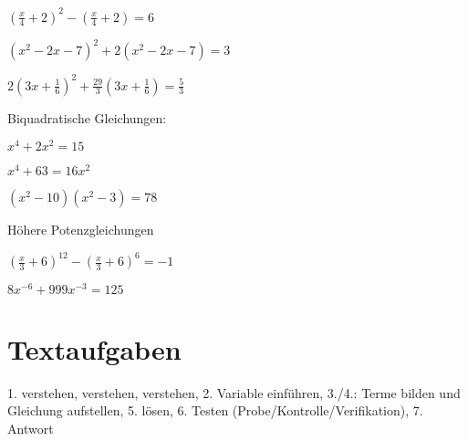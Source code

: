 \begin{bbwAufgabenBlock}
\item $\left( \frac{x}4 + 2  \right)^2 - \left( \frac{x}4 + 2 \right) = 6$

\item $\left( x^2-2x-7 \right)^2 + 2 \left(  x^2-2x-7 \right) = 3$

\item $2 \left( 3x+\frac16 \right)^2 +\frac{29}3 \left(  3x+\frac16 \right) = \frac53$

Biquadratische Gleichungen:

\item $x^4 + 2x^2 = 15$

\item $x^4 + 63 = 16x^2$


\item $(x^2-10)(x^2-3) = 78$


Höhere Potenzgleichungen

\item $\left(\frac{x}3 + 6 \right)^{12} - \left(\frac{x}3 + 6  \right)^6 = -1$

\item $8x^{-6} + 999x^{-3} = 125$


\end{bbwAufgabenBlock}
\newpage




\section{Textaufgaben}

1. verstehen, verstehen, verstehen, 2. Variable einführen, 3./4.: Terme bilden und Gleichung aufstellen,
5. lösen, 6. Testen (Probe/Kontrolle/Verifikation), 7. Antwort

